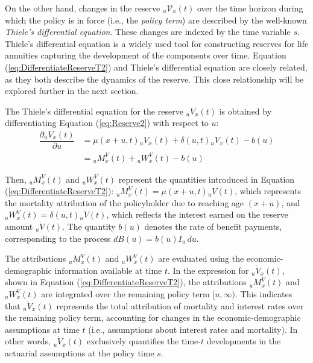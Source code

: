 \documentclass[12pt]{article}
\begin{document}
{On the other hand, changes in the reserve \( {}_u\mathcal{V}_x(t) \) over the time horizon during which the policy is in force (i.e., the \textit{policy term}) are described by the well-known \textit{Thiele's differential equation}. These changes are indexed by the time variable \( s \). Thiele's differential equation is a widely used tool for constructing reserves for life annuities capturing the development of the components over time. Equation (\ref{eq:DifferentiateReserveT2}) and Thiele's differential equation are closely related, as they both describe the dynamics of the reserve. This close relationship will be explored further in the next section.

The Thiele's differential equation for the reserve \( {}_uV_x(t) \) is obtained by differentiating Equation (\ref{eq:Reserve2}) with respect to \( u \):
\begin{equation}\label{eq:Thiele}
	\begin{split}
		\dfrac{\partial {}_uV_x(t)}{\partial u}&= \mu(x+u,t){}_uV_x(t) + \delta(u,t){}_uV_x(t) - b(u) \\
		&= {}_uM^V_x(t) + {}_uW^V_x(t) - b(u)
	\end{split}
\end{equation}

Then, ${}_uM^V_x(t)$ and ${}_uW^V_x(t)$ represent the quantities introduced in Equation (\ref{eq:DifferentiateReserveT2}): ${}_uM^V_x(t) = \mu(x+u,t){}_uV(t)$, which represents the mortality attribution of the policyholder due to reaching age \( (x+u) \), and ${}_uW^V_x(t) = \delta(u,t){}_uV(t)$, which reflects the interest earned on the reserve amount ${}_uV(t)$. The quantity \( b(u) \) denotes the rate of benefit payments, corresponding to the process \( dB(u) = b(u) I_{u} \, du \).

The attributions ${}_uM^V_x(t)$ and ${}_uW^V_x(t)$ are evaluated using the economic-demographic information available at time \( t \). In the expression for ${}_u\dot{V}_x(t)$, shown in Equation (\ref{eq:DifferentiateReserveT2}), the attributions ${}_uM^V_x(t)$ and ${}_uW^V_x(t)$ are integrated over the remaining policy term \( [u, \infty) \). This indicates that ${}_u\dot{V}_x(t)$ represents the total attribution of mortality and interest rates over the remaining policy term, accounting for changes in the economic-demographic assumptions at time \( t \) (i.e., assumptions about interest rates and mortality). In other words, ${}_u\dot{V}_x(t)$ exclusively quantifies the time-\( t \) developments in the actuarial assumptions at the policy time \( s \).

}
\end{document}
